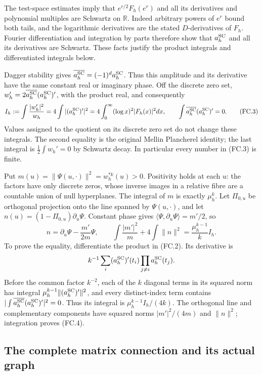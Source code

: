 The test-space estimates imply that \(e^{r/2}F_h(e^r)\) and all
its derivatives and polynomial multiples are Schwartz on \(\mathbb R\).
Indeed arbitrary powers of \(e^r\) bound both tails, and the
logarithmic derivatives are the stated \(D\)-derivatives of \(F_h\).
Fourier differentiation and integration by parts therefore show that
\(a_h^{\rm SC}\) and all its derivatives are Schwartz. These facts
justify the product integrals and differentiated integrals below.

Dagger stability gives \(\overline{a_h^{\rm SC}}=(-1)^d a_h^{\rm SC}\).
Thus this amplitude and its derivative have the same constant real or
imaginary phase. Off the discrete zero set,
\(w_h'=2\overline{a_h^{\rm SC}}(a_h^{\rm SC})'\), with the
product real, and consequently
\[
 I_h:=\int\frac{|w_h'|^2}{w_h}
   =4\int|(a_h^{\rm SC})'|^2
   =4\int_0^\infty(\log x)^2|F_h(x)|^2dx,
 \qquad \int\overline{a_h^{\rm SC}}(a_h^{\rm SC})'=0.
 \tag{FC.3}
\]
Values assigned to the quotient on its discrete zero set do not
change these integrals. The second equality is the original Mellin
Plancherel identity; the last integral is \(\frac12\int w_h'=0\)
by Schwartz decay. In particular every number in (FC.3) is finite.

Put \(m(u)=\|\Psi(u,\cdot)\|^2=w_h^{*k}(u)>0\). Positivity holds
at each \(u\): the factors have only discrete zeros, whose inverse
images in a relative fibre are a countable union of null hyperplanes.
The integral of \(m\) is exactly \(\mu_h^k\). Let \(\Pi_{0,u}\)
be orthogonal projection onto the line spanned by \(\Psi(u,\cdot)\),
and let \(n(u)=(1-\Pi_{0,u})\partial_u\Psi\). Constant phase gives
\(\langle\Psi,\partial_u\Psi\rangle=m'/2\), so
\[
 n=\partial_u\Psi-\frac{m'}{2m}\Psi,\qquad
 \boxed{\int\frac{|m'|^2}{m}+4\int\|n\|^2
                   =\frac{\mu_h^{k-1}}k I_h.}
 \tag{FC.4}
\]
To prove the equality, differentiate the product in (FC.2).
Its derivative is
\[
 k^{-1}\sum_i(a_h^{\rm SC})'(t_i)
                \prod_{j\ne i}a_h^{\rm SC}(t_j).
\]
Before the common factor \(k^{-2}\), each of the \(k\) diagonal
terms in its squared norm has integral
\(\mu_h^{k-1}\|(a_h^{\rm SC})'\|^2\), and every distinct-index
term contains \(|\int\overline{a_h^{\rm SC}}(a_h^{\rm SC})'|^2=0\).
Thus its integral is \(\mu_h^{k-1}I_h/(4k)\). The orthogonal
line and complementary components have squared norms
\(|m'|^2/(4m)\) and \(\|n\|^2\); integration proves (FC.4).

\subsection{The complete matrix connection and its actual graph}

